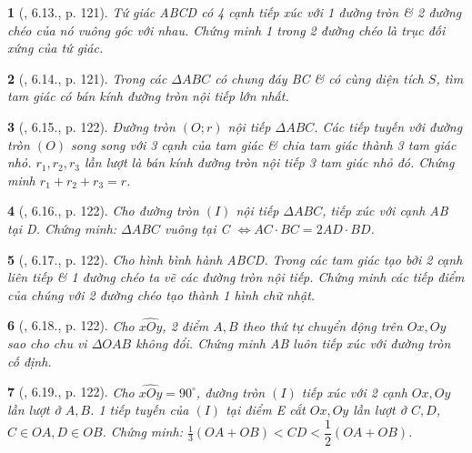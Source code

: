 \documentclass{article}
\newtheorem{baitoan}{}
\begin{document}
\begin{baitoan}[\cite{Binh_boi_duong_Toan_9_tap_1}, 6.13., p. 121]
	Tứ giác ABCD có 4 cạnh tiếp xúc với 1 đường tròn \& 2 đường chéo của nó vuông góc với nhau. Chứng minh 1 trong 2 đường chéo là trục đối xứng của tứ giác.
\end{baitoan}

\begin{baitoan}[\cite{Binh_boi_duong_Toan_9_tap_1}, 6.14., p. 121]
	Trong các $\Delta ABC$ có chung đáy BC \& có cùng diện tích $S$, tìm tam giác có bán kính đường tròn nội tiếp lớn nhất.
\end{baitoan}

\begin{baitoan}[\cite{Binh_boi_duong_Toan_9_tap_1}, 6.15., p. 122]
	Đường tròn $(O;r)$ nội tiếp $\Delta ABC$. Các tiếp tuyến với đường tròn $(O)$ song song với 3 cạnh của tam giác \& chia tam giác thành 3 tam giác nhỏ. $r_1,r_2,r_3$ lần lượt là bán kính đường tròn nội tiếp 3 tam giác nhỏ đó. Chứng minh $r_1 + r_2 + r_3 = r$.
\end{baitoan}

\begin{baitoan}[\cite{Binh_boi_duong_Toan_9_tap_1}, 6.16., p. 122]
	Cho đường tròn $(I)$ nội tiếp $\Delta ABC$, tiếp xúc với cạnh AB tại D. Chứng minh: $\Delta ABC$ vuông tại C $\Leftrightarrow AC\cdot BC = 2AD\cdot BD$.
\end{baitoan}

\begin{baitoan}[\cite{Binh_boi_duong_Toan_9_tap_1}, 6.17., p. 122]
	Cho hình bình hành ABCD. Trong các tam giác tạo bởi 2 cạnh liên tiếp \& 1 đường chéo ta vẽ các đường tròn nội tiếp. Chứng minh các tiếp điểm của chúng với 2 đường chéo tạo thành 1 hình chữ nhật.
\end{baitoan}

\begin{baitoan}[\cite{Binh_boi_duong_Toan_9_tap_1}, 6.18., p. 122]
	Cho $\widehat{xOy}$, 2 điểm $A,B$ theo thứ tự chuyển động trên $Ox,Oy$ sao cho chu vi $\Delta OAB$ không đổi. Chứng minh AB luôn tiếp xúc với đường tròn cố định.
\end{baitoan}

\begin{baitoan}[\cite{Binh_boi_duong_Toan_9_tap_1}, 6.19., p. 122]
	Cho $\widehat{xOy} = 90^\circ$, đường tròn $(I)$ tiếp xúc với 2 cạnh $Ox,Oy$ lần lượt ở $A,B$. 1 tiếp tuyến của $(I)$ tại điểm E cắt $Ox,Oy$ lần lượt ở $C,D$, $C\in OA,D\in OB$. Chứng minh: $\frac{1}{3}(OA + OB) < CD < \dfrac{1}{2}(OA + OB)$.
\end{baitoan}
\end{document}
